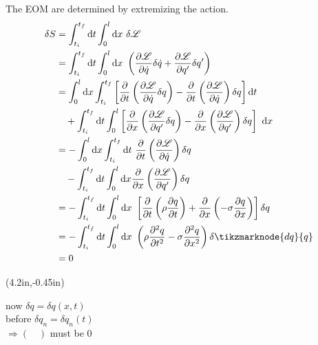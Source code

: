 \documentclass{article}
\begin{document}
\noindent The EOM are determined by extremizing the action.
\begin{align*}
    \delta S &= \int_{t_i}^{t_f} \mathrm{d}t \int_0^l \mathrm{d}x~ \delta \mathscr{L} \\
    &= \int_{t_i}^{t_f} \mathrm{d}t \int_0^l \mathrm{d}x~ \left( \dfrac{ \partial \mathscr{L} }{ \partial \dot{q} } \delta \dot{q} + \dfrac{ \partial \mathscr{L} }{ \partial q' } \delta q' \right) \\
    &= \int_0^l \mathrm{d}x \int_{t_i}^{t_f} \left[ \dfrac{\partial}{ \partial t } \left( \dfrac{ \partial \mathscr{L} }{ \partial \dot{q} } \delta q \right) - \dfrac{\partial}{ \partial t } \left( \dfrac{ \partial \mathscr{L} }{ \partial \dot{q} } \right) \delta q \right] \mathrm{d}t \\
    &\quad + \int_{t_i}^{t_f} \mathrm{d}t \int_0^l \left[ \dfrac{\partial}{ \partial x } \left( \dfrac{ \partial \mathscr{L} }{ \partial q' } \delta q \right) - \dfrac{\partial}{ \partial x } \left( \dfrac{ \partial \mathscr{L} }{ \partial q' } \right) \delta q \right] ~\mathrm{d}x \\
    &= - \int_0^l \mathrm{d}x \int_{t_i}^{t_f} \mathrm{d}t~ \dfrac{\partial}{ \partial t } \left( \dfrac{ \partial \mathscr{L} }{ \partial \dot{q} } \right) \delta q \\
    &\quad - \int_{t_i}^{t_f} \mathrm{d}t \int_0^l \mathrm{d}x \dfrac{\partial}{ \partial x } \left( \dfrac{ \partial \mathscr{L} }{ \partial q' } \right) \delta q \\
    &= - \int_{t_i}^{t_f} \mathrm{d}t \int_0^l \mathrm{d}x~ \left[ \dfrac{\partial}{ \partial t } \left( \rho \dfrac{ \partial q }{ \partial t } \right) + \dfrac{\partial}{ \partial x } \left( - \sigma \dfrac{ \partial q }{ \partial x } \right) \right] \delta q \\
    &= - \int_{t_i}^{t_f} \mathrm{d}t \int_0^l \mathrm{d}x~ \left( \rho \dfrac{ \partial^2 q }{ \partial t^2 } - \sigma \dfrac{ \partial^2 q }{ \partial x^2 } \right) \delta \tikzmarknode{dq}{q} \\
    &= 0
\end{align*}
{%
\begin{textblock*}{3in}(4.2in,-0.45in)%
\begin{minipage}[h!]{3in}
     now $\delta q = \delta q (x, t )$ \\
    before $\delta q_n = \delta q_n (t)$ \\
    $\Rightarrow ( \quad )$ must be 0
\end{minipage}%
\end{textblock*}%
}
\end{document}

